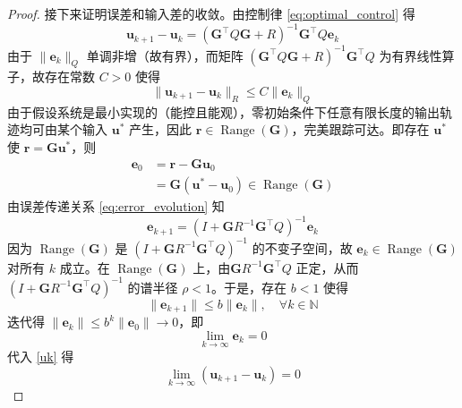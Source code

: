 \begin{proof}
	接下来证明误差和输入差的收敛。由控制律 \eqref{eq:optimal_control} 得
	\begin{equation}
		\mathbf{u}_{k+1} - \mathbf{u}_k = (\mathbf{G}^\top Q \mathbf{G} + R)^{-1} \mathbf{G}^\top Q \mathbf{e}_k
	\end{equation}
	由于 $\|\mathbf{e}_k\|_Q$ 单调非增（故有界），而矩阵 $(\mathbf{G}^\top Q \mathbf{G} + R)^{-1} \mathbf{G}^\top Q$ 为有界线性算子，故存在常数 $C>0$ 使得
	\begin{equation}
		\|\mathbf{u}_{k+1} - \mathbf{u}_k\|_R \le C \|\mathbf{e}_k\|_Q
		\label{uk}
	\end{equation}
	由于假设系统是最小实现的（能控且能观），零初始条件下任意有限长度的输出轨迹均可由某个输入 $\mathbf{u}^*$ 产生，因此 $\mathbf{r} \in \operatorname{Range}(\mathbf{G})$，完美跟踪可达。即存在 $\mathbf{u}^*$ 使 $\mathbf{r} = \mathbf{G} \mathbf{u}^*$，则
\begin{equation}
	\begin{aligned}
		\mathbf{e}_0 &= \mathbf{r} - \mathbf{G} \mathbf{u}_0 \\
		&= \mathbf{G}(\mathbf{u}^* - \mathbf{u}_0) \in \operatorname{Range}(\mathbf{G})
	\end{aligned}
\end{equation}
	由误差传递关系 \eqref{eq:error_evolution} 知
	\begin{equation}
		\mathbf{e}_{k+1} = (I + \mathbf{G} R^{-1} \mathbf{G}^\top Q)^{-1} \mathbf{e}_k
	\end{equation}
	因为 $\operatorname{Range}(\mathbf{G})$ 是 $(I + \mathbf{G} R^{-1} \mathbf{G}^\top Q)^{-1}$ 的不变子空间，故 $\mathbf{e}_k \in \operatorname{Range}(\mathbf{G})$ 对所有 $k$ 成立。在 $\operatorname{Range}(\mathbf{G})$ 上，由$\mathbf{G} R^{-1} \mathbf{G}^\top Q$ 正定，从而 $(I + \mathbf{G} R^{-1} \mathbf{G}^\top Q)^{-1}$ 的谱半径 $\rho < 1$。于是，存在 $b<1$ 使得
	\begin{equation}
		\|\mathbf{e}_{k+1}\| \le b \|\mathbf{e}_k\|, \quad \forall k \in \mathbb{N}
	\end{equation}
	迭代得 $\|\mathbf{e}_k\| \le b^k \|\mathbf{e}_0\| \to 0$，即
	\begin{equation}
		\lim_{k\to\infty} \mathbf{e}_k = 0
	\end{equation}
	代入 \eqref{uk} 得
	\begin{equation}
		\lim_{k\to\infty} (\mathbf{u}_{k+1} - \mathbf{u}_k) = 0
	\end{equation}
	

\end{proof}
